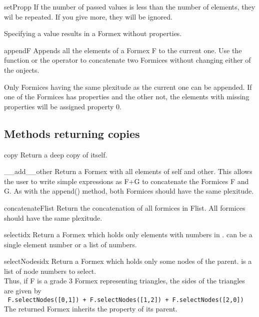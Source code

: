 {{\begin{methoddesc}{setProp}{p}
If the number of passed values is less than the number of elements, they wil be repeated. If you give more, they will be ignored. 

Specifying a value  results in a Formex without properties.
\end{methoddesc}

\begin{methoddesc}{append}{F}
Appends all the elements of a Formex F to the current one. Use the  function or the \Code{+} operator to concatenate two Formices without changing either of the onjects.

Only Formices having the same plexitude as the current one can be appended.
If one of the Formices has properties and the other not, the elements with missing properties will be assigned property 0.
\end{methoddesc}


\subsection{Methods returning copies}

\begin{methoddesc}{copy}{}
Return a deep copy of itself.
\end{methoddesc}


\begin{methoddesc}{__add__}{other}
Return a Formex with all elements of self and other. This allows the user to write simple expressions as F+G to concatenate the Formices F and G. As with the append() method, both Formices should have the same plexitude.
\end{methoddesc}


\begin{methoddesc}{concatenate}{Flist}
Return the concatenation of all formices in Flist. All formices should have the same plexitude. \classmethod 
\end{methoddesc}


\begin{methoddesc}{select}{idx}
Return a Formex which holds only elements with numbers in .
 can be a single element number or a list of numbers.
\end{methoddesc}

\begin{methoddesc}{selectNodes}{idx}
Return a Formex which holds only some nodes of the parent.  is a list of node numbers to select.\\
Thus, if F is a grade 3 Formex representing triangles, the sides of the triangles are given by\\
\verb? F.selectNodes([0,1]) + F.selectNodes([1,2]) + F.selectNodes([2,0]) ?\\
The returned Formex inherits the property of its parent.
\end{methoddesc}

}}
